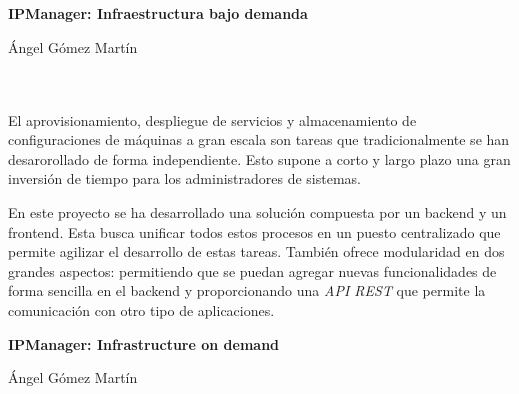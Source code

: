 

\cleardoublepage

\chapter*{}
\thispagestyle{empty}

\begin{center}
{\large\bfseries IPManager: Infraestructura bajo demanda}\\
\end{center}
\begin{center}
Ángel Gómez Martín
\end{center}

\\

\vspace{0.7cm}
\\

El aprovisionamiento, despliegue de servicios y almacenamiento de configuraciones de máquinas a gran escala son tareas que tradicionalmente se han desarorollado de forma independiente. Esto supone a corto y largo plazo una gran inversión de tiempo para los administradores de sistemas.

\bigskip
En este proyecto se ha desarrollado una solución compuesta por un backend y un frontend. Esta busca unificar todos estos procesos en un puesto centralizado que permite agilizar el desarrollo de estas tareas. También ofrece modularidad en dos grandes aspectos: permitiendo que se puedan agregar nuevas funcionalidades de forma sencilla en el backend y proporcionando una \textit{API REST} que permite la comunicación con otro tipo de aplicaciones.


\cleardoublepage
\thispagestyle{empty}

\begin{center}
{\large\bfseries IPManager: Infrastructure on demand}\\
\end{center}
\begin{center}
Ángel Gómez Martín
\end{center}

\\

\vspace{0.7cm}
\\

